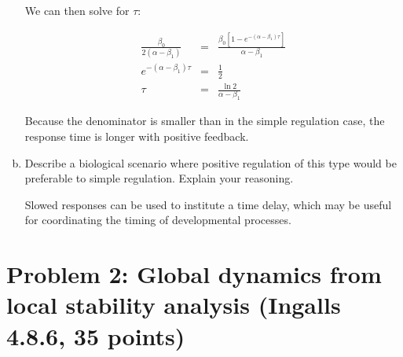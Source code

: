 \documentclass{article}
\begin{document}
\begin{enumerate}[a)]
{We can then solve for $\tau$:

\begin{eqnarray*}
\frac{ \beta_0}{2(\alpha - \beta_1)} & = & \frac{\beta_0 \left[ 1 - e^{-\left(\alpha - \beta_1 \right)\tau}  \right]}{\alpha - \beta_1}\\
e^{-\left(\alpha - \beta_1 \right)\tau}  & = & \frac{1}{2}\\
\tau & = & \frac{\ln 2}{\alpha - \beta_1}
\end{eqnarray*}

Because the denominator is smaller than in the simple regulation case, the response time is longer with positive feedback.

}


\item Describe a biological scenario where positive regulation of this type would be preferable to simple regulation. Explain your reasoning.\\

{ \color{red}

Slowed responses can be used to institute a time delay, which may be useful for coordinating the timing of developmental processes.

}


\end{enumerate}

\section*{Problem 2: Global dynamics from local stability analysis (Ingalls 4.8.6, 35 points)}
\end{document}
